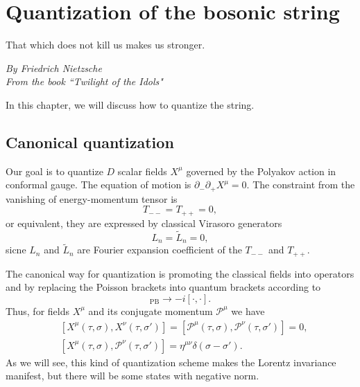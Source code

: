 \documentclass[graybox,envcountchap,sectrefs]{svmono}
\begin{document}
\chapter{Quantization of the bosonic string}

\epigraph{That which does not kill us makes us stronger.}
{\textit{By Friedrich Nietzsche\\ From the book ``Twilight of the Idols"}}





In this chapter, we will discuss how to quantize the string.



\section{Canonical quantization}

Our goal is to quantize $D$ scalar fields $X^{\mu}$ governed by the Polyakov action in conformal gauge. 
The equation of motion is $\partial_{-}\partial_{+}X^{\mu}=0$.
The constraint from the vanishing of energy-momentum tensor is
\begin{equation}
T_{--}=T_{++}=0,
\end{equation}
or equivalent, they are expressed by classical Virasoro generators
\begin{equation}
L_n=\tilde{L}_n=0,	
\end{equation}
sicne $L_n$ and $\tilde{L}_n$ are Fourier expansion coefficient of the $T_{--}$ and $T_{++}$.


The canonical way for quantization is promoting the classical fields into operators and by replacing the Poisson brackets into quantum brackets according to
\begin{equation}
[\cdot,\cdot]_{\mathrm{PB}}\to -i[\cdot,\cdot].
\end{equation}
Thus, for fields $X^{\mu}$ and its conjugate momentum $\mathcal{P}^{\mu}$ we have
\begin{align}
&[X^{\mu}(\tau,\sigma),X^{\nu}(\tau,\sigma')]=[\mathcal{P}^{\mu}(\tau,\sigma),\mathcal{P}^{\nu}(\tau,\sigma')]=0,\\
&[X^{\mu}(\tau,\sigma),\mathcal{P}^{\nu}(\tau,\sigma')]=\eta^{\mu\nu}\delta(\sigma-\sigma').
\end{align}
 As we will see, this kind of quantization scheme makes the Lorentz invariance manifest, but there will be some states with negative norm.
 
\end{document}
